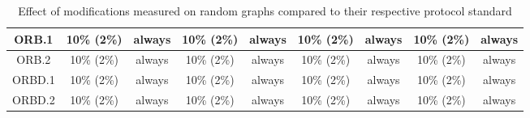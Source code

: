 \begin{table*}
{\begin{tabular}{c|cc|cc|cc|cc|}
\multicolumn{1}{|c|}{ORB.1}       & 10\% (2\%)            & always               & 10\% (2\%)             & always               & 10\% (2\%)            & always               & 10\% (2\%)             & always               \\ \hline
\multicolumn{1}{|c|}{ORB.2}       & 10\% (2\%)            & always               & 10\% (2\%)             & always               & 10\% (2\%)            & always               & 10\% (2\%)             & always               \\ \hline
\multicolumn{1}{|c|}{ORBD.1}      & 10\% (2\%)            & always               & 10\% (2\%)             & always               & 10\% (2\%)            & always               & 10\% (2\%)             & always               \\ \hline
\multicolumn{1}{|c|}{ORBD.2}      & 10\% (2\%)            & always               & 10\% (2\%)             & always               & 10\% (2\%)            & always               & 10\% (2\%)             & always               \\ \hline
\end{tabular}
    }
  \caption{Effect of modifications measured on random graphs compared to their respective protocol standard}
  \label{eval:individual-results}
\end{table*}

